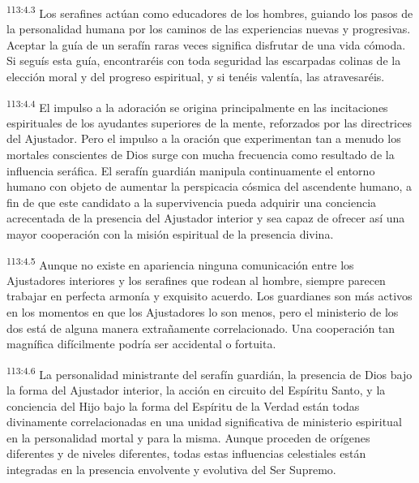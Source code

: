 \documentclass[twoside, 11pt]{book}
\begin{document}
\par
\textsuperscript{113:4.3} Los serafines actúan como educadores de los hombres, guiando los pasos de la personalidad humana por los caminos de las experiencias nuevas y progresivas. Aceptar la guía de un serafín raras veces significa disfrutar de una vida cómoda. Si seguís esta guía, encontraréis con toda seguridad las escarpadas colinas de la elección moral y del progreso espiritual, y si tenéis valentía, las atravesaréis.

\par
\textsuperscript{113:4.4} El impulso a la adoración se origina principalmente en las incitaciones espirituales de los ayudantes superiores de la mente, reforzados por las directrices del Ajustador. Pero el impulso a la oración que experimentan tan a menudo los mortales conscientes de Dios surge con mucha frecuencia como resultado de la influencia seráfica. El serafín guardián manipula continuamente el entorno humano con objeto de aumentar la perspicacia cósmica del ascendente humano, a fin de que este candidato a la supervivencia pueda adquirir una conciencia acrecentada de la presencia del Ajustador interior y sea capaz de ofrecer así una mayor cooperación con la misión espiritual de la presencia divina.

\par
\textsuperscript{113:4.5} Aunque no existe en apariencia ninguna comunicación entre los Ajustadores interiores y los serafines que rodean al hombre, siempre parecen trabajar en perfecta armonía y exquisito acuerdo. Los guardianes son más activos en los momentos en que los Ajustadores lo son menos, pero el ministerio de los dos está de alguna manera extrañamente correlacionado. Una cooperación tan magnífica difícilmente podría ser accidental o fortuita.

\par
\textsuperscript{113:4.6} La personalidad ministrante del serafín guardián, la presencia de Dios bajo la forma del Ajustador interior, la acción en circuito del Espíritu Santo, y la conciencia del Hijo bajo la forma del Espíritu de la Verdad están todas divinamente correlacionadas en una unidad significativa de ministerio espiritual en la personalidad mortal y para la misma. Aunque proceden de orígenes diferentes y de niveles diferentes, todas estas influencias celestiales están integradas en la presencia envolvente y evolutiva del Ser Supremo.
\end{document}
